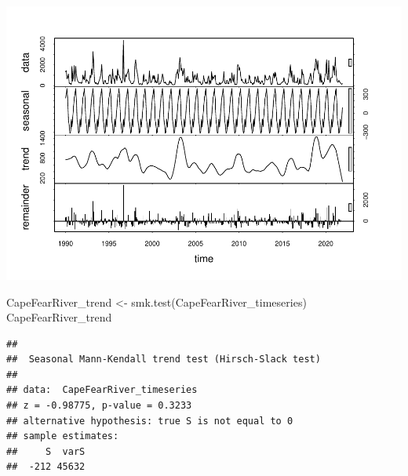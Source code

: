\documentclass[
  12pt,
]{article}
\newenvironment{Shaded}{\begin{snugshade}}{\end{snugshade}}
\newcommand{\AttributeTok}[1]{\textcolor[rgb]{0.77,0.63,0.00}{#1}}
\newcommand{\DecValTok}[1]{\textcolor[rgb]{0.00,0.00,0.81}{#1}}
\newcommand{\FunctionTok}[1]{\textcolor[rgb]{0.00,0.00,0.00}{#1}}
\newcommand{\NormalTok}[1]{#1}
\newcommand{\OtherTok}[1]{\textcolor[rgb]{0.56,0.35,0.01}{#1}}
\newcommand{\SpecialCharTok}[1]{\textcolor[rgb]{0.00,0.00,0.00}{#1}}
\newcommand{\StringTok}[1]{\textcolor[rgb]{0.31,0.60,0.02}{#1}}
\begin{document}
\begin{Shaded}
\end{Shaded}

\includegraphics{Project_files/figure-latex/time-series analysis on Regular Water Resources-1.pdf}

\begin{Shaded}
\begin{Highlighting}[]
\NormalTok{CapeFearRiver\_trend }\OtherTok{\textless{}{-}} \FunctionTok{smk.test}\NormalTok{(CapeFearRiver\_timeseries)}
\NormalTok{CapeFearRiver\_trend}
\end{Highlighting}
\end{Shaded}

\begin{verbatim}
## 
##  Seasonal Mann-Kendall trend test (Hirsch-Slack test)
## 
## data:  CapeFearRiver_timeseries
## z = -0.98775, p-value = 0.3233
## alternative hypothesis: true S is not equal to 0
## sample estimates:
##     S  varS 
##  -212 45632
\end{verbatim}
\end{document}
